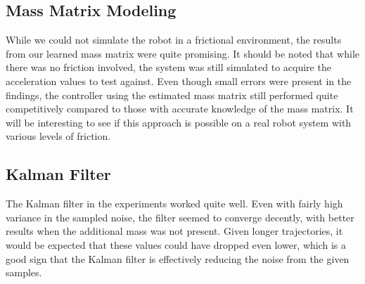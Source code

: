 \subsection*{Mass Matrix Modeling}
While we could not simulate the robot in a frictional environment, the results from our learned mass matrix were quite promising.
It should be noted that while there was no friction involved, the system was still simulated to acquire the acceleration values to test against.
Even though small errors were present in the findings, the controller using the estimated mass matrix still performed quite competitively compared to those with accurate knowledge of the mass matrix.
It will be interesting to see if this approach is possible on a real robot system with various levels of friction.

\subsection*{Kalman Filter}
The Kalman filter in the experiments worked quite well.
Even with fairly high variance in the sampled noise, the filter seemed to converge decently, with better results when the additional mass was not present.
Given longer trajectories, it would be expected that these values could have dropped even lower, which is a good sign that the Kalman filter is effectively reducing the noise from the given samples.
